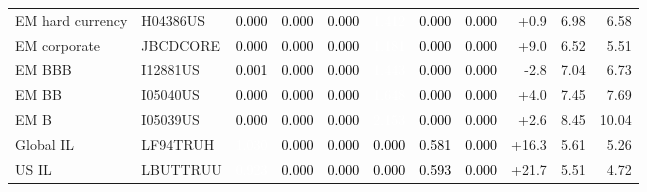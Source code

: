 \documentclass[a4paper,review]{cas-sc}
\begin{document}
\begin{table}[pos=htbp]
\begin{adjustbox}{max width=\linewidth}
\begin{tabular}{llrrrrrrrrr}
EM hard currency & H04386US & \cellcolor[HTML]{FFFFFF}\textcolor{black}{0.000} & \cellcolor[HTML]{FFFFFF}\textcolor{black}{0.000} & \cellcolor[HTML]{FFFFFF}\textcolor{black}{0.000} & \cellcolor[HTML]{7C0722}\textcolor{white}{1.412} & \cellcolor[HTML]{FFFFFF}\textcolor{black}{0.000} & \cellcolor[HTML]{FFFFFF}\textcolor{black}{0.000} & +0.9 & 6.98 & 6.58 \\
EM corporate & JBCDCORE & \cellcolor[HTML]{FFFFFF}\textcolor{black}{0.000} & \cellcolor[HTML]{FFFFFF}\textcolor{black}{0.000} & \cellcolor[HTML]{FFFFFF}\textcolor{black}{0.000} & \cellcolor[HTML]{B41C2D}\textcolor{white}{1.181} & \cellcolor[HTML]{FFFFFF}\textcolor{black}{0.000} & \cellcolor[HTML]{FFFFFF}\textcolor{black}{0.000} & +9.0 & 6.52 & 5.51 \\
EM BBB & I12881US & \cellcolor[HTML]{F7F6F6}\textcolor{black}{0.001} & \cellcolor[HTML]{FFFFFF}\textcolor{black}{0.000} & \cellcolor[HTML]{FFFFFF}\textcolor{black}{0.000} & \cellcolor[HTML]{730421}\textcolor{white}{1.443} & \cellcolor[HTML]{FFFFFF}\textcolor{black}{0.000} & \cellcolor[HTML]{FFFFFF}\textcolor{black}{0.000} & -2.8 & 7.04 & 6.73 \\
EM BB & I05040US & \cellcolor[HTML]{FFFFFF}\textcolor{black}{0.000} & \cellcolor[HTML]{FFFFFF}\textcolor{black}{0.000} & \cellcolor[HTML]{FFFFFF}\textcolor{black}{0.000} & \cellcolor[HTML]{67001F}\textcolor{white}{1.648} & \cellcolor[HTML]{FFFFFF}\textcolor{black}{0.000} & \cellcolor[HTML]{FFFFFF}\textcolor{black}{0.000} & +4.0 & 7.45 & 7.69 \\
EM B & I05039US & \cellcolor[HTML]{FFFFFF}\textcolor{black}{0.000} & \cellcolor[HTML]{FFFFFF}\textcolor{black}{0.000} & \cellcolor[HTML]{FFFFFF}\textcolor{black}{0.000} & \cellcolor[HTML]{67001F}\textcolor{white}{2.153} & \cellcolor[HTML]{FFFFFF}\textcolor{black}{0.000} & \cellcolor[HTML]{FFFFFF}\textcolor{black}{0.000} & +2.6 & 8.45 & 10.04 \\
Global IL & LF94TRUH & \cellcolor[HTML]{C6413E}\textcolor{white}{1.030} & \cellcolor[HTML]{FFFFFF}\textcolor{black}{0.000} & \cellcolor[HTML]{FFFFFF}\textcolor{black}{0.000} & \cellcolor[HTML]{FFFFFF}\textcolor{black}{0.000} & \cellcolor[HTML]{F5A886}\textcolor{black}{0.581} & \cellcolor[HTML]{FFFFFF}\textcolor{black}{0.000} & +16.3 & 5.61 & 5.26 \\
US IL & LBUTTRUU & \cellcolor[HTML]{D35A4A}\textcolor{white}{0.923} & \cellcolor[HTML]{FFFFFF}\textcolor{black}{0.000} & \cellcolor[HTML]{FFFFFF}\textcolor{black}{0.000} & \cellcolor[HTML]{FFFFFF}\textcolor{black}{0.000} & \cellcolor[HTML]{F4A683}\textcolor{black}{0.593} & \cellcolor[HTML]{FFFFFF}\textcolor{black}{0.000} & +21.7 & 5.51 & 4.72 \\

\end{tabular}
\end{adjustbox}
\end{table}
\end{document}
